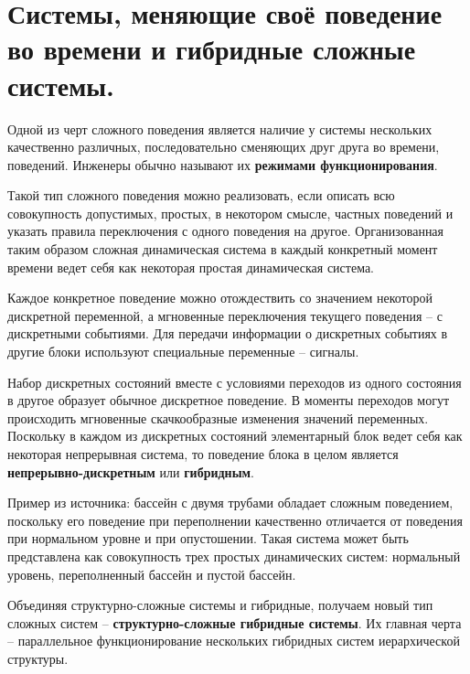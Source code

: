 \section{Системы, меняющие своё поведение во времени и гибридные сложные системы.}

Одной из черт сложного поведения является наличие у системы нескольких
качественно различных, последовательно сменяющих друг друга во времени,
поведений. Инженеры обычно называют их \textbf{режимами функционирования}.

Такой тип сложного поведения можно реализовать, если описать всю
совокупность допустимых, простых, в некотором смысле, частных поведений и
указать правила переключения с одного поведения на другое. Организованная
таким образом сложная динамическая система в каждый конкретный момент
времени ведет себя как некоторая простая динамическая система.

Каждое конкретное поведение можно отождествить со значением некоторой
дискретной переменной, а мгновенные переключения текущего поведения -- с
дискретными событиями. Для передачи информации о дискретных событиях в
другие блоки используют специальные переменные -- сигналы.

Набор дискретных состояний вместе с условиями переходов из одного состояния
в другое образует обычное дискретное поведение. В моменты переходов могут
происходить мгновенные скачкообразные изменения значений переменных.
Поскольку в каждом из дискретных состояний элементарный блок ведет себя как
некоторая непрерывная система, то поведение блока в целом является
\textbf{непрерывно-дискретным} или \textbf{гибридным}.

Пример из источника: бассейн с двумя трубами обладает сложным поведением,
поскольку его поведение при переполнении качественно отличается от поведения
при нормальном уровне и при опустошении. Такая система может быть
представлена как совокупность трех простых динамических систем: нормальный
уровень, переполненный бассейн и пустой бассейн.

Объединяя структурно-сложные системы и гибридные, получаем новый тип
сложных систем -- \textbf{структурно-сложные гибридные системы}. Их главная
черта -- параллельное функционирование нескольких гибридных систем
иерархической структуры.

\clearpage
